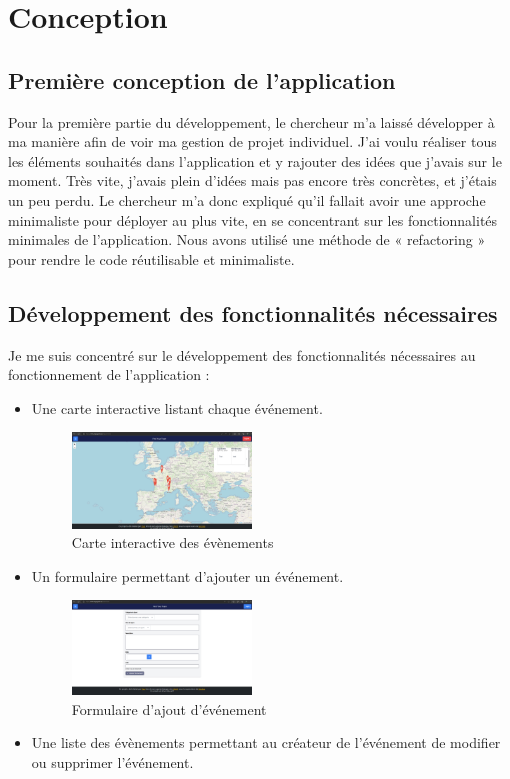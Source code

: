\section{Conception}

\subsection{Première conception de l’application}

Pour la première partie du développement, le chercheur m’a laissé développer à ma manière afin de voir ma gestion de projet individuel.
J’ai voulu réaliser tous les éléments souhaités dans l’application et y rajouter des idées que j’avais sur le moment.
Très vite, j’avais plein d’idées mais pas encore très concrètes, et j’étais un peu perdu. Le chercheur m’a donc expliqué qu’il fallait avoir une approche minimaliste pour déployer au plus vite, en se concentrant sur les fonctionnalités minimales de l’application. Nous avons utilisé une méthode de « refactoring » pour rendre le code réutilisable et minimaliste.

\subsection{Développement des fonctionnalités nécessaires}

Je me suis concentré sur le développement des fonctionnalités nécessaires au fonctionnement de l’application :
\begin{itemize}
    \item Une carte interactive listant chaque événement.
    \begin{figure}[H]
        \centering
        \includegraphics[width=0.45\textwidth]{image/fytMap}
        \caption{Carte interactive des évènements}
        \label{fig:fytMap}
    \end{figure}
    \item Un formulaire permettant d’ajouter un événement.
    \begin{figure}[H]
        \centering
        \includegraphics[width=0.45\textwidth]{image/fytForm}
        \caption{Formulaire d'ajout d'événement}
        \label{fig:fytForm}
    \end{figure}
    \item Une liste des évènements permettant au créateur de l’événement de modifier ou supprimer l’événement.
\end{itemize}

